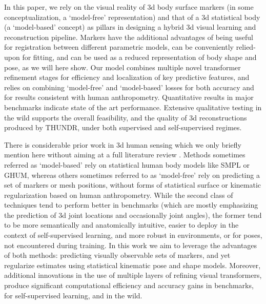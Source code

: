 \documentclass[10pt,twocolumn,letterpaper]{article}
\begin{document}
In this paper, we rely on the visual reality of 3d body surface markers (in some conceptualization, a `model-free' representation) and that of a 3d statistical body (a `model-based' concept) as pillars in designing a hybrid 3d visual learning and reconstruction pipeline. Markers have the additional advantages of being useful for registration between different parametric models, can be conveniently relied-upon for fitting, and can be used as a reduced representation of body shape and pose, as we will here show. Our model combines multiple novel transformer refinement stages for efficiency and localization of key predictive features, and relies on combining `model-free' and `model-based' losses for both accuracy and for results consistent with human anthropometry. Quantitative results in major benchmarks indicate state of the art performance. Extensive qualitative testing in the wild supports the overall feasibility, and the quality of 3d reconstructions produced by THUNDR, under both supervised and self-supervised regimes.

 There is considerable prior work in 3d human sensing which we only briefly mention here without aiming at a full literature review \cite{sminchisescu_ijrr03,bogo2016,SMPL2015,ghum2020,dmhs_cvpr17,zanfir2018monocular,Rhodin_2018_ECCV,Kanazawa2018,kolotouros2019learning,ExPose:2020,choi2020pose2mesh,zanfir2020neural}. Methods sometimes referred as `model-based' \cite{zanfir2018monocular,kolotouros2019learning,guler2019holopose,moon2020MeshNet,jiang2020coherent,biggs20203d,xu2019denserac,zhang2020object,arnab2019exploiting,zeng20203d,georgakis2020hierarchical} rely on statistical human body models like SMPL or GHUM, whereas others sometimes referred to as `model-free' \cite{varol18_bodynet,sun2018integral,iqbal2020weakly,zeng20203d} rely on predicting a set of markers or mesh positions, without forms of statistical surface or kinematic regularization based on human anthropometry. While the second class of techniques tend to perform better in benchmarks (which are mostly emphasizing the prediction of 3d joint locations and occasionally joint angles), the former tend to be more semantically and anatomically intuitive, easier to deploy in the context of self-supervised learning, and more robust in environments, or for poses, not encountered during training. In this work we aim to leverage the advantages of both methods: predicting visually observable sets of markers, and yet regularize estimates using statistical kinematic pose and shape models. Moreover, additional innovations in the use of multiple layers of refining visual transformers, produce significant computational efficiency and accuracy gains in benchmarks, for self-supervised learning, and in the wild. 
\end{document}
